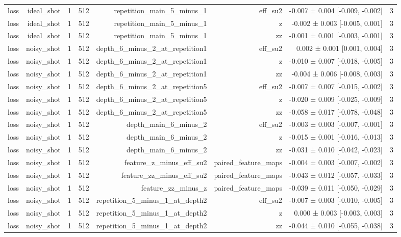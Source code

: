 \begin{table}
\begin{tabular}{lrrrrrrr}
loss & ideal\_shot & 1 & 512 & repetition\_main\_5\_minus\_1 & eff\_su2 & -0.007 ± 0.004 [-0.009, -0.002] & 3 \\
loss & ideal\_shot & 1 & 512 & repetition\_main\_5\_minus\_1 & z & -0.002 ± 0.003 [-0.005, 0.001] & 3 \\
loss & ideal\_shot & 1 & 512 & repetition\_main\_5\_minus\_1 & zz & -0.001 ± 0.001 [-0.003, -0.001] & 3 \\
loss & noisy\_shot & 1 & 512 & depth\_6\_minus\_2\_at\_repetition1 & eff\_su2 & 0.002 ± 0.001 [0.001, 0.004] & 3 \\
loss & noisy\_shot & 1 & 512 & depth\_6\_minus\_2\_at\_repetition1 & z & -0.010 ± 0.007 [-0.018, -0.005] & 3 \\
loss & noisy\_shot & 1 & 512 & depth\_6\_minus\_2\_at\_repetition1 & zz & -0.004 ± 0.006 [-0.008, 0.003] & 3 \\
loss & noisy\_shot & 1 & 512 & depth\_6\_minus\_2\_at\_repetition5 & eff\_su2 & -0.007 ± 0.007 [-0.015, -0.002] & 3 \\
loss & noisy\_shot & 1 & 512 & depth\_6\_minus\_2\_at\_repetition5 & z & -0.020 ± 0.009 [-0.025, -0.009] & 3 \\
loss & noisy\_shot & 1 & 512 & depth\_6\_minus\_2\_at\_repetition5 & zz & -0.058 ± 0.017 [-0.078, -0.048] & 3 \\
loss & noisy\_shot & 1 & 512 & depth\_main\_6\_minus\_2 & eff\_su2 & -0.003 ± 0.003 [-0.007, -0.001] & 3 \\
loss & noisy\_shot & 1 & 512 & depth\_main\_6\_minus\_2 & z & -0.015 ± 0.001 [-0.016, -0.013] & 3 \\
loss & noisy\_shot & 1 & 512 & depth\_main\_6\_minus\_2 & zz & -0.031 ± 0.010 [-0.042, -0.023] & 3 \\
loss & noisy\_shot & 1 & 512 & feature\_z\_minus\_eff\_su2 & paired\_feature\_maps & -0.004 ± 0.003 [-0.007, -0.002] & 3 \\
loss & noisy\_shot & 1 & 512 & feature\_zz\_minus\_eff\_su2 & paired\_feature\_maps & -0.043 ± 0.012 [-0.057, -0.033] & 3 \\
loss & noisy\_shot & 1 & 512 & feature\_zz\_minus\_z & paired\_feature\_maps & -0.039 ± 0.011 [-0.050, -0.029] & 3 \\
loss & noisy\_shot & 1 & 512 & repetition\_5\_minus\_1\_at\_depth2 & eff\_su2 & -0.007 ± 0.003 [-0.010, -0.005] & 3 \\
loss & noisy\_shot & 1 & 512 & repetition\_5\_minus\_1\_at\_depth2 & z & 0.000 ± 0.003 [-0.003, 0.003] & 3 \\
loss & noisy\_shot & 1 & 512 & repetition\_5\_minus\_1\_at\_depth2 & zz & -0.044 ± 0.010 [-0.055, -0.038] & 3 \\

\end{tabular}
\end{table}
